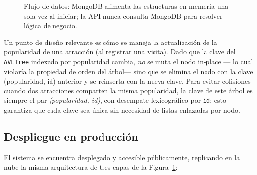 \documentclass[conference]{IEEEtran}
\begin{document}
\begin{figure}[htbp]
\centering
{}
\caption{Flujo de datos: MongoDB alimenta las estructuras en memoria una sola
vez al iniciar; la API nunca consulta MongoDB para resolver l\'ogica de
negocio.}
\label{fig:arquitectura}
\end{figure}

Un punto de dise\~no relevante es c\'omo se maneja la actualizaci\'on de la
popularidad de una atracci\'on (al registrar una visita). Dado que la clave
del \texttt{AVLTree} indexado por popularidad cambia, \emph{no} se muta el
nodo in-place --- lo cual violar\'ia la propiedad de orden del \'arbol--- sino
que se elimina el nodo con la clave (popularidad, id) anterior y se reinserta
con la nueva clave. Para evitar colisiones cuando dos atracciones comparten
la misma popularidad, la clave de este \'arbol es siempre el par
\emph{(popularidad, id)}, con desempate lexicogr\'afico por \texttt{id};
esto garantiza que cada clave sea \'unica sin necesidad de listas enlazadas
por nodo.

\subsection{Despliegue en producci\'on}

El sistema se encuentra desplegado y accesible p\'ublicamente, replicando en
la nube la misma arquitectura de tres capas de la Figura~\ref{fig:arquitectura}:
\end{document}
